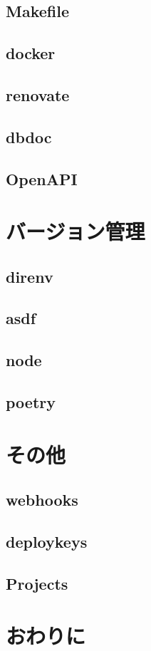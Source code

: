 \subsection{Makefile}
\subsection{docker}
\subsection{renovate}
\subsection{dbdoc}
\subsection{OpenAPI}

\section{バージョン管理}

\subsection{direnv}
\subsection{asdf}
\subsection{node}
\subsection{poetry}

\section{その他}
\subsection{webhooks}
\subsection{deploykeys}
\subsection{Projects}

\section{おわりに}